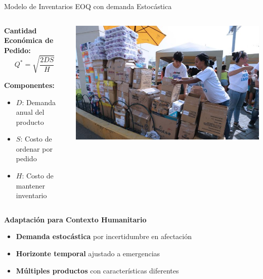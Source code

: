 \documentclass[
  ignorenonframetext,
]{beamer}
\providecommand{\tightlist}{%
  \setlength{\itemsep}{0pt}\setlength{\parskip}{0pt}}
\begin{document}
\begin{frame}{Modelo de Inventarios EOQ con demanda Estocástica}
\label{modelo-de-inventarios-eoq-con-demanda-estocuxe1stica}
\begin{columns}[T]
\begin{column}{0.5\linewidth}
\textbf{Cantidad Económica de Pedido:} \[Q^* = \sqrt{\frac{2DS}{H}}\]

\textbf{Componentes:}

\begin{itemize}
\tightlist
\item
  \(D\): Demanda anual del producto
\item
  \(S\): Costo de ordenar por pedido
\item
  \(H\): Costo de mantener inventario
\end{itemize}
\end{column}

\begin{column}{0.5\linewidth}
\includegraphics[width=0.85\linewidth,height=\textheight,keepaspectratio]{ayuda.png}
\end{column}
\end{columns}

\textbf{Adaptación para Contexto Humanitario}

\begin{itemize}
\tightlist
\item
  \textbf{Demanda estocástica} por incertidumbre en afectación
\item
  \textbf{Horizonte temporal} ajustado a emergencias
\item
  \textbf{Múltiples productos} con características diferentes
\end{itemize}
\end{frame}
\end{document}
